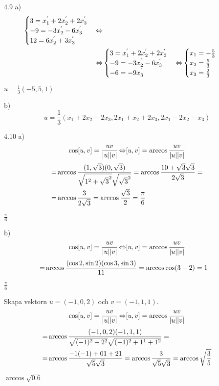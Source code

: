 \begin{task}{4.9 a)}
\begin{align*}
\begin{cases}
			3=x^{'}_1+2x^{'}_2+2x^{'}_3 \\
			-9=-3x^{'}_2-6x^{'}_3 \\
			12=6x^{'}_2+3x^{'}_3
		\end{cases} \operatorname{\Leftrightarrow} \\ \operatorname{\Leftrightarrow}
		&\begin{cases}
			3=x^{'}_1+2x^{'}_2+2x^{'}_3 \\
			-9=-3x^{'}_2-6x^{'}_3 \\
			-6=-9x^{'}_3
		\end{cases} \operatorname{\Leftrightarrow}
		\begin{cases}
			x_1=-\frac{5}{3} \\
			x_2=\frac{5}{3} \\
			x_3=\frac{2}{3}
		\end{cases}
	\end{align*}

	\ans $u=\frac{1}{3}(-5,5,1)$
\end{task}

\begin{task}{b)}
	\[u=\frac{1}{3}(x_1+2x_2-2x_3,2x_1+x_2+2x_3,2x_1-2x_2-x_3)\]
\end{task}

\begin{task}{4.10 a)}
	\[\cos[u,v]=\frac{u\*v}{|u||v|} \lra
	[u,v]=\arccos\frac{u\*v}{|u||v|}\]
	\begin{align*}
		[u,v]=&\arccos\frac{(1,\sqrt{3})\*(0,\sqrt{3})}{\sqrt{1^2+\sqrt{3}^2}\sqrt{\sqrt{3}^2}}=
		\arccos\frac{1\*0+\sqrt{3}\*\sqrt{3}}{2\sqrt{3}}= \\ =
		&\arccos\frac{3}{2\sqrt{3}}=
		\arccos\frac{\sqrt{3}}{2}=
		\frac{\pi}{6}
	\end{align*}

	\ans $\frac{\pi}{6}$
\end{task}

\begin{task}{b)}
	\[\cos[u,v]=\frac{u\*v}{|u||v|} \lra
	[u,v]=\arccos\frac{u\*v}{|u||v|}\]
	\begin{align*}
		[u,v]=&\arccos\frac{(\cos2,\sin2)\*(\cos3,\sin3)}{1\*1}=
		\arccos\cos(3-2)= 1
	\end{align*}

	\ans $\frac{\pi}{6}$
\end{task}

\begin{task}{4.11}
	Skapa vektorn $u=(-1,0,2)$ och $v=(-1,1,1)$.
	\[\cos[u,v]=\frac{u\*v}{|u||v|} \lra
	[u,v]=\arccos\frac{u\*v}{|u||v|}\]
	\begin{align*}
		[u,v]=&\arccos\frac{(-1,0,2)\*(-1,1,1)}{\sqrt{(-1)^2+2^2}\sqrt{(-1)^2+1^1+1^2}}= \\ =
		&\arccos\frac{-1\*(-1)+0\*1+2\*1}{\sqrt{5}\sqrt{3}}=
		\arccos\frac{3}{\sqrt{5}\sqrt{3}}=
		\arccos\sqrt{\frac{3}{5}}
	\end{align*}

	\ans $\arccos\sqrt{0.6}$
\end{task}

